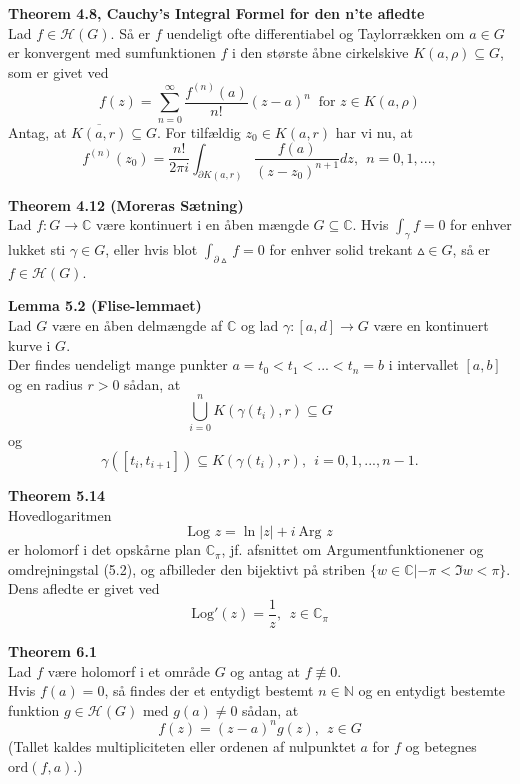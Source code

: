 \documentclass[10pt,a4paper]{article}
\theoremstyle{definition}
\begin{document}
\newpage
\begin{framed}
\textbf{Theorem 4.8, Cauchy's Integral Formel for den n'te afledte} \\
Lad $f \in \mathcal{H}(G)$. Så er $f$ uendeligt ofte differentiabel og Taylorrækken om $a \in G$ er konvergent med sumfunktionen $f$ i den største åbne cirkelskive $K(a, \rho) \subseteq G$, som er givet ved
$$f(z)= \sum\limits_{n=0}^\infty \frac{f^{(n)}(a)}{n!} (z-a)^n \ \text{ for } z \in K(a,\rho)$$
Antag, at $\overline{K(a,r)} \subseteq G$. For tilfældig $z_0 \in K(a,r)$ har vi nu, at
$$f^{(n)}(z_0) = \frac{n!}{2 \pi i} \int_{\partial K(a,r)} \frac{f(a)}{(z-z_0)^{n+1}} dz, \ \ n = 0, 1, ...,$$
\end{framed}

\begin{framed}
\textbf{Theorem 4.12 (Moreras Sætning)} \\
Lad $f : G \rightarrow \mathbb{C}$ være kontinuert i en åben mængde $G \subseteq \mathbb{C}$. Hvis $\int_\gamma f = 0$ for enhver lukket sti $\gamma \in G$, eller hvis blot $\int_{\partial \vartriangle} f = 0$ for enhver solid trekant $\vartriangle \in G$, så er $f \in \mathcal{H}(G)$.
\end{framed}

\begin{framed}
\textbf{Lemma 5.2 (Flise-lemmaet)} \\
Lad $G$ være en åben delmængde af $\mathbb{C}$ og lad $\gamma : [a,d] \rightarrow G$ være en kontinuert kurve i $G$. \\
Der findes uendeligt mange punkter $a=t_0 < t_1 < ... < t_n=b$ i intervallet $[a,b]$ og en radius $r>0$ sådan, at
$$\bigcup_{i=0}^n K(\gamma(t_i),r) \subseteq G$$
og
$$\gamma([t_i,t_{i+1}]) \subseteq K(\gamma(t_i),r), \ \ i = 0,1,...,n-1.$$
\end{framed}

\begin{framed}
\textbf{Theorem 5.14} \\
Hovedlogaritmen
$$\text{Log } z = \ln |z| + i \ \text{Arg }z$$
er holomorf i det opskårne plan $\mathbb{C}_\pi$, jf. afsnittet om Argumentfunktionener og omdrejningstal (5.2), og afbilleder den bijektivt på striben $\{w \in \mathbb{C} | -\pi < \Im w < \pi\}$. Dens afledte er givet ved
$$\text{Log}'(z) = \frac{1}{z}, \ \ z \in \mathbb{C}_\pi$$
\end{framed}

\newpage
\begin{framed}
\textbf{Theorem 6.1} \\
Lad $f$ være holomorf i et område $G$ og antag at $f \not\equiv 0$. \\
Hvis $f(a)=0$, så findes der et entydigt bestemt $n \in \mathbb{N}$ og en entydigt bestemte funktion $g \in \mathcal{H}(G)$ med $g(a) \neq 0$ sådan, at
$$f(z) = (z-a)^n g(z), \ \ z \in G$$
(Tallet kaldes multipliciteten eller ordenen af nulpunktet $a$ for $f$ og betegnes $\text{ord}(f,a)$.)
\end{framed}
\end{document}

